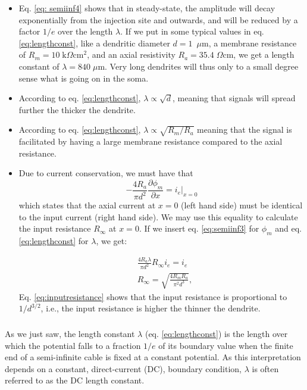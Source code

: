 \begin{itemize}

\item Eq. \ref{eq: semiinf4} shows that in steady-state, the amplitude will decay exponentially from the injection site and outwards, and will be reduced by a factor $1/e$ over the length $\lambda$. If we put in some typical values in eq. \ref{eq:lengthconst}, like a dendritic diameter $d=1$~$\mu$m, a membrane resistance of $R_m=10\;\text{k}\Omega\text{cm}^2$, and an axial resistivity $R_a=35.4\;\Omega\text{cm}$, we get a length constant of $\lambda = 840\; \mu$m. Very long dendrites will thus only to a small degree sense what is going on in the soma.

\item According to eq. \ref{eq:lengthconst}, $\lambda \propto \sqrt{d}$, meaning that signals will spread further the thicker the dendrite.

\item According to eq. \ref{eq:lengthconst}, $\lambda \propto \sqrt{R_m/R_a}$ meaning that the signal is facilitated by having a large membrane resistance compared to the axial resistance.

\item Due to current conservation, we must have that
\begin{equation}
- \frac{4R_a}{\pi d^2} \frac{\partial \phi_m}{\partial x}  = i_e  \Big|_{x=0}
\end{equation}
which states that the axial current at $x=0$ (left hand side) must be identical to the input current (right hand side). We may use this equality to calculate the input resistance $R_{\infty}$ at $x=0$. If we insert eq. \ref{eq:semiinf3} for $\phi_m$ and eq. \ref{eq:lengthconst} for $\lambda$, we get:

\begin{align}
&\frac{4R_a \lambda}{\pi d^2} R_{\infty} i_e  = i_e \\
&R_{\infty} =  \sqrt{\frac{4R_m R_a}{\pi^2 d^3}}, 
\label{eq:inputresistance}
\end{align}
Eq. \ref{eq:inputresistance} shows that the input resistance is proportional to $1/d^{3/2}$, i.e., the input resistance is higher the thinner the dendrite. 
\end{itemize}



\subsubsection{}
As we just saw, the length constant $\lambda$ (eq. \ref{eq:lengthconst}) is the length over which the potential falls to a fraction $1/e$ of its boundary value when the finite end of a semi-infinite cable is fixed at a constant potential. As this interpretation depends on a constant, direct-current (DC), boundary condition, $\lambda$ is often referred to as the DC length constant. 

